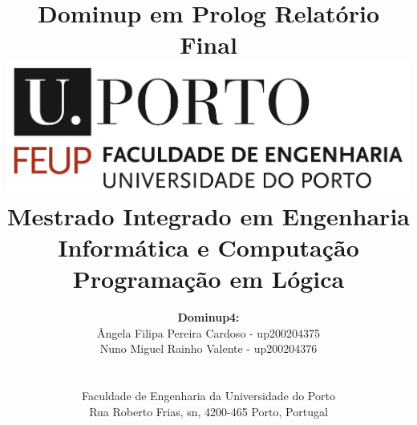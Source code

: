 \documentclass[a4paper]{article}
\begin{document}

\title{\Huge\textbf{Dominup em Prolog}\linebreak\linebreak\linebreak
\Large\textbf{Relatório Final}\linebreak\linebreak
\linebreak\linebreak
\includegraphics[scale=0.1]{feup-logo.png}\linebreak\linebreak
\linebreak\linebreak
\Large{Mestrado Integrado em Engenharia Informática e Computação} \linebreak\linebreak
\Large{Programação em Lógica}\linebreak
}

\author{\textbf{Dominup4:}\\
Ângela Filipa Pereira Cardoso - up200204375 \\
Nuno Miguel Rainho Valente - up200204376 \\
\linebreak\linebreak \\
 \\ Faculdade de Engenharia da Universidade do Porto \\ Rua Roberto Frias, s\/n, 4200-465 Porto, Portugal \linebreak\linebreak\linebreak
\linebreak\linebreak\vspace{1cm}}

\maketitle
\thispagestyle{empty}
\end{document}

